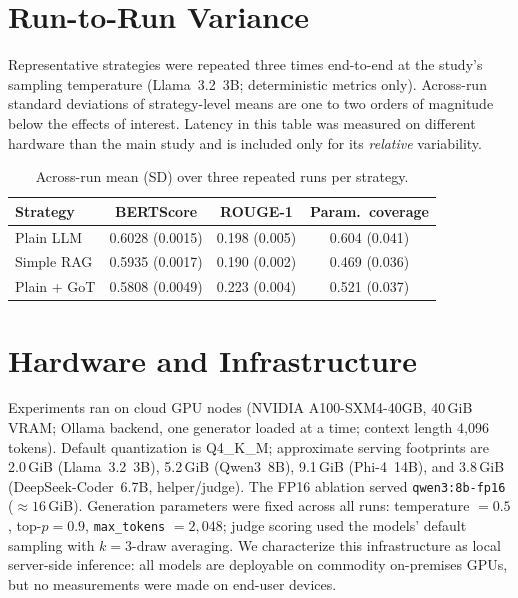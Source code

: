 \documentclass[pdflatex,sn-mathphys-ay]{sn-jnl}%
\theoremstyle{thmstyleone}%
\theoremstyle{thmstyletwo}%
\theoremstyle{thmstylethree}%
\begin{document}
{\color{blue}
\section{Run-to-Run Variance}
\label{sec:appendix-variance}
Representative strategies were repeated three times end-to-end at the study's sampling temperature (Llama~3.2~3B; deterministic metrics only). Across-run standard deviations of strategy-level means are one to two orders of magnitude below the effects of interest. Latency in this table was measured on different hardware than the main study and is included only for its \emph{relative} variability.

\begin{table}[h]
\centering
\small
\caption{Across-run mean (SD) over three repeated runs per strategy.}
\label{tab:variance}
\begin{tabular}{lccc}
\toprule
\textbf{Strategy} & \textbf{BERTScore} & \textbf{ROUGE-1} & \textbf{Param.\ coverage} \\
\midrule
Plain LLM   & 0.6028 (0.0015) & 0.198 (0.005) & 0.604 (0.041) \\
Simple RAG  & 0.5935 (0.0017) & 0.190 (0.002) & 0.469 (0.036) \\
Plain + GoT & 0.5808 (0.0049) & 0.223 (0.004) & 0.521 (0.037) \\
\bottomrule
\end{tabular}
\end{table}

\section{Hardware and Infrastructure}
\label{sec:appendix-hardware}
Experiments ran on cloud GPU nodes (NVIDIA A100-SXM4-40GB, 40\,GiB VRAM; Ollama backend, one generator loaded at a time; context length 4,096 tokens). Default quantization is Q4\_K\_M; approximate serving footprints are 2.0\,GiB (Llama~3.2~3B), 5.2\,GiB (Qwen3~8B), 9.1\,GiB (Phi-4~14B), and 3.8\,GiB (DeepSeek-Coder~6.7B, helper/judge). The FP16 ablation served \texttt{qwen3:8b-fp16} (${\approx}16$\,GiB). Generation parameters were fixed across all runs: temperature $=0.5$, top-$p=0.9$, \texttt{max\_tokens} $=2{,}048$; judge scoring used the models' default sampling with $k{=}3$-draw averaging. We characterize this infrastructure as local server-side inference: all models are deployable on commodity on-premises GPUs, but no measurements were made on end-user devices.


}
\end{document}

